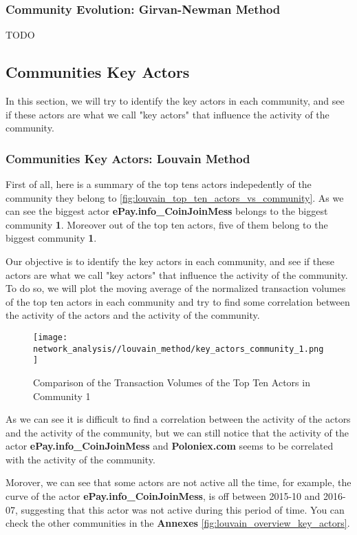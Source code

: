 \documentclass[a4paper, 12pt]{article}
\begin{document}
\newpage

\subsubsection{Community Evolution: Girvan-Newman Method}
TODO

\newpage

\subsection{Communities Key Actors}
In this section, we will try to identify the key actors in each community, and see if these actors are what we call "key actors" that influence the activity of the community.

\subsubsection{Communities Key Actors: Louvain Method}

First of all, here is a summary of the top tens actors indepedently of the community they belong to \ref{fig:louvain_top_ten_actors_vs_community}.
As we can see the biggest actor \textbf{ePay.info\_CoinJoinMess} belongs to the biggest community \textbf{1}.
Moreover out of the top ten actors, five of them belong to the biggest community \textbf{1}.

Our objective is to identify the key actors in each community, and see if these actors are what we call "key actors" that influence the activity of the community.
To do so, we will plot the moving average of the normalized transaction volumes of the top ten actors in each community and try to find some correlation between the activity of the actors and the activity of the community.


\begin{figure}[h]
    \centering
    \texttt{[image: network\_analysis//louvain\_method/key\_actors\_community\_1.png]}
    \caption{Comparison of the Transaction Volumes of the Top Ten Actors in Community 1}
    \label{fig:enter-label}
\end{figure}

As we can see it is difficult to find a correlation between the activity of the actors and the activity of the community,
but we can still notice that the activity of the actor \textbf{ePay.info\_CoinJoinMess} and \textbf{Poloniex.com} 
seems to be correlated with the activity of the community.

Morover, we can see that some actors are not active all the time, for example, the curve of the actor \textbf{ePay.info\_CoinJoinMess},
is off between 2015-10 and 2016-07, suggesting that this actor was not active during this period of time. 
You can check the other communities in the \textbf{Annexes} \ref{fig:louvain_overview_key_actors}. \\ 
\end{document}
